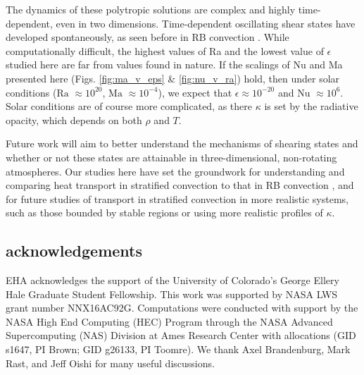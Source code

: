 \documentclass[aps, prl, twocolumn, nofootinbib, groupedaddress, amsfonts, amssymb, amsmath]{revtex4-1}
\begin{document}

The dynamics of these polytropic solutions are complex and highly time-dependent, even in two dimensions.
Time-dependent oscillating shear states have developed spontaneously, as seen before in RB convection
\cite{goluskin&all2014}.  While computationally difficult, the highest values of Ra and the lowest value
of $\epsilon$ studied here are far from values found in nature.  If the scalings of Nu and Ma
presented here (Figs. \ref{fig:ma_v_eps} \& \ref{fig:nu_v_ra}) hold, then under solar conditions ($\text{Ra }\approx 10^{20}$, $\text{Ma }\approx 10^{-4}$), we expect that $\epsilon \approx 10^{-20}$ and
$\text{Nu }\approx 10^{6}$.  
Solar conditions are of course more complicated, as there $\kappa$ is
set by the radiative opacity, which depends on both $\rho$ and $T$.

Future work will aim to better understand the mechanisms of shearing states and
whether or not these states are attainable in three-dimensional, non-rotating atmospheres.  Our studies
here have set the groundwork for understanding and comparing heat transport in stratified convection
to that in RB convection \cite{johnston&doering2009}, and for future studies of transport in stratified
convection in more realistic systems, such as those bounded by stable regions \cite{hurlburt&all1986} or 
using more realistic profiles of $\kappa$.



\subsection{acknowledgements}
EHA acknowledges the support of the University of Colorado’s George 
Ellery Hale Graduate Student Fellowship.
This work was supported by  NASA LWS grant number NNX16AC92G.  
Computations were conducted 
with support by the NASA High End Computing (HEC) Program through the NASA 
Advanced Supercomputing (NAS) Division at Ames Research Center
with allocations (GID s1647, PI Brown; GID g26133, PI Toomre).
We thank Axel Brandenburg, Mark Rast, and Jeff Oishi for many useful discussions.


\end{document}

